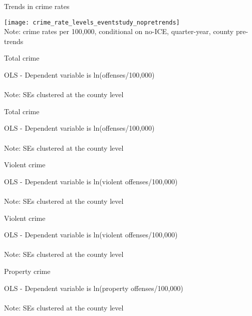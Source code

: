\documentclass[xcolor=pdftex,dvipsnames,table,handout]{beamer}
\newcommand{\tablesfolder}{/Users/bbiasi/Dropbox/Research/sanctuaries/sanctuaries_git/tex/tables}
\begin{document}
\begin{frame}{Trends in crime rates}
\begin{center}
\texttt{[image: crime\_rate\_levels\_eventstudy\_nopretrends]}\\
\footnotesize{Note: crime rates per 100,000, conditional on no-ICE, quarter-year, county pre-trends}
\end{center}
\end{frame}

\begin{frame}{Total crime}
\footnotesize
\begin{center}
OLS - Dependent variable is ln(offenses/100,000)\\

\\\footnotesize{Note: SEs clustered at the county level}
\end{center}
\end{frame}

\begin{frame}{Total crime}
\footnotesize
\begin{center}
OLS - Dependent variable is ln(offenses/100,000)\\

\\\footnotesize{Note: SEs clustered at the county level}
\end{center}
\end{frame}

\begin{frame}{Violent crime}
\footnotesize
\begin{center}
OLS - Dependent variable is ln(violent offenses/100,000)\\

\\\footnotesize{Note: SEs clustered at the county level}
\end{center}
\end{frame}

\begin{frame}{Violent crime}
\footnotesize
\begin{center}
OLS - Dependent variable is ln(violent offenses/100,000)\\

\\\footnotesize{Note: SEs clustered at the county level}
\end{center}
\end{frame}

\begin{frame}{Property crime}
\footnotesize
\begin{center}
OLS - Dependent variable is ln(property offenses/100,000)\\

\\\footnotesize{Note: SEs clustered at the county level}
\end{center}
\end{frame}
\end{document}
